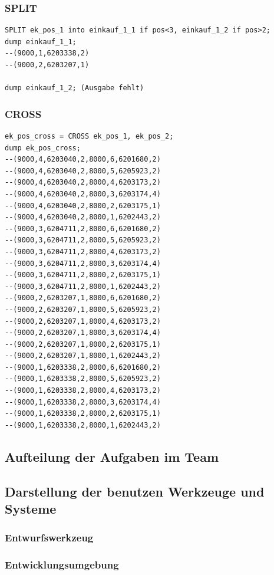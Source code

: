 \begin{itemize}
\subsubsection*{SPLIT}
\begin{lstlisting}
SPLIT ek_pos_1 into einkauf_1_1 if pos<3, einkauf_1_2 if pos>2;
dump einkauf_1_1;
--(9000,1,6203338,2)
--(9000,2,6203207,1)

dump einkauf_1_2; (Ausgabe fehlt)
\end{lstlisting}

\subsubsection*{CROSS}
\begin{lstlisting}
ek_pos_cross = CROSS ek_pos_1, ek_pos_2;
dump ek_pos_cross;
--(9000,4,6203040,2,8000,6,6201680,2)
--(9000,4,6203040,2,8000,5,6205923,2)
--(9000,4,6203040,2,8000,4,6203173,2)
--(9000,4,6203040,2,8000,3,6203174,4)
--(9000,4,6203040,2,8000,2,6203175,1)
--(9000,4,6203040,2,8000,1,6202443,2)
--(9000,3,6204711,2,8000,6,6201680,2)
--(9000,3,6204711,2,8000,5,6205923,2)
--(9000,3,6204711,2,8000,4,6203173,2)
--(9000,3,6204711,2,8000,3,6203174,4)
--(9000,3,6204711,2,8000,2,6203175,1)
--(9000,3,6204711,2,8000,1,6202443,2)
--(9000,2,6203207,1,8000,6,6201680,2)
--(9000,2,6203207,1,8000,5,6205923,2)
--(9000,2,6203207,1,8000,4,6203173,2)
--(9000,2,6203207,1,8000,3,6203174,4)
--(9000,2,6203207,1,8000,2,6203175,1)
--(9000,2,6203207,1,8000,1,6202443,2)
--(9000,1,6203338,2,8000,6,6201680,2)
--(9000,1,6203338,2,8000,5,6205923,2)
--(9000,1,6203338,2,8000,4,6203173,2)
--(9000,1,6203338,2,8000,3,6203174,4)
--(9000,1,6203338,2,8000,2,6203175,1)
--(9000,1,6203338,2,8000,1,6202443,2)
\end{lstlisting}
\end{itemize}
\subsection*{Aufteilung der Aufgaben im Team}
\subsection*{Darstellung der benutzen Werkzeuge und Systeme}
\subsubsection*{Entwurfswerkzeug}
\subsubsection*{Entwicklungsumgebung}



